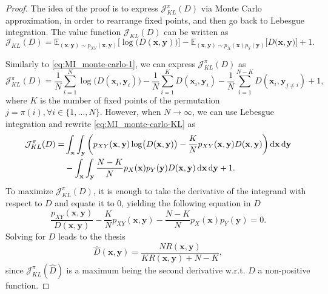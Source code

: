 \begin{proof}
The idea of the proof is to express $\mathcal{J}_{KL}^{\pi}(D)$ via Monte Carlo approximation, in order to rearrange fixed points, and then go back to Lebesgue integration.
The value function $\mathcal{J}_{KL}(D)$ can be written as
\begin{equation}
    \mathcal{J}_{KL}(D) =  \mathbb{E}_{(\mathbf{x},\mathbf{y}) \sim p_{XY}(\mathbf{x},\mathbf{y})}\biggl[\log\bigl(D(\mathbf{x},\mathbf{y})\bigr)\biggr]  -\mathbb{E}_{(\mathbf{x},\mathbf{y}) \sim p_{X}(\mathbf{x})p_{Y}(\mathbf{y})}\biggl[D\bigl(\mathbf{x},\mathbf{y}\bigr)\biggr]+1.
\end{equation}

Similarly to \eqref{eq:MI_monte-carlo-1}, we can express $\mathcal{J}_{KL}^{\pi}(D)$ as
\begin{equation}
\label{eq:MI_monte-carlo-KL}
    \mathcal{J}_{KL}^{\pi}(D) = \frac{1}{N}\sum_{i=1}^{N}{\log\bigl(D(\mathbf{x}_i,\mathbf{y}_i)\bigr)}-  \frac{1}{N}\sum_{i=1}^{K}{D(\mathbf{x}_i,\mathbf{y}_{i})} -  \frac{1}{N}\sum_{i=1}^{N-K}{D(\mathbf{x}_i,\mathbf{y}_{j\neq i})} +1,
\end{equation}
where $K$ is the number of fixed points of the permutation $j=\pi(i), \forall i \in \{1,\dots,N\}$.
However, when $N \to \infty$, we can use Lebesgue integration and rewrite \eqref{eq:MI_monte-carlo-KL} as
\begin{align}
    \mathcal{J}_{KL}^{\pi}(D) = &\int_{\mathbf{x}}\int_{\mathbf{y}}{\biggl(p_{XY}(\mathbf{x},\mathbf{y})\log\bigl(D(\mathbf{x},\mathbf{y})\bigr) -\frac{K}{N}p_{XY}(\mathbf{x},\mathbf{y})D(\mathbf{x},\mathbf{y})\biggr)\mathop{}\!\mathrm{d} \mathbf{x} \mathop{}\!\mathrm{d} \mathbf{y}} \nonumber \\ 
    & -\int_{\mathbf{x}}\int_{\mathbf{y}}{\frac{N-K}{N}p_{X}(\mathbf{x})p_Y(\mathbf{y})D(\mathbf{x},\mathbf{y})\mathop{}\!\mathrm{d} \mathbf{x} \mathop{}\!\mathrm{d} \mathbf{y}}+1.
\end{align}
To maximize $\mathcal{J}_{KL}^{\pi}(D)$, it is enough to take the derivative of the integrand with respect to $D$ and equate it to $0$, yielding the following equation in $D$
\begin{equation}
    \frac{p_{XY}(\mathbf{x},\mathbf{y})}{D(\mathbf{x},\mathbf{y})}-\frac{K}{N}p_{XY}(\mathbf{x},\mathbf{y}) -\frac{N-K}{N}p_{X}(\mathbf{x})p_Y(\mathbf{y}) =0.
\end{equation}
Solving for $D$ leads to the thesis 
\begin{equation}
\hat{D}(\mathbf{x},\mathbf{y}) =  \frac{NR(\mathbf{x},\mathbf{y})}{KR(\mathbf{x},\mathbf{y})+N-K},
\end{equation}
since $\mathcal{J}_{KL}^{\pi}(\hat{D})$ is a maximum being the second derivative w.r.t. $D$ a non-positive function.
\end{proof}

